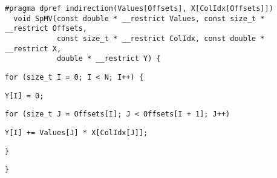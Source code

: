 \begin{lstlisting}[style=cppcode]
  #pragma dpref indirection(Values[Offsets], X[ColIdx[Offsets]])
  void SpMV(const double * __restrict Values, const size_t * __restrict Offsets,
            const size_t * __restrict ColIdx, const double * __restrict X,
            double * __restrict Y) {
\end{lstlisting}\vspace{-\baselineskip}

\begin{lstlisting}[style=cppcode, backgroundcolor=\color{yellow!15}, firstnumber=last]
    for (size_t I = 0; I < N; I++) {
\end{lstlisting}\vspace{-\baselineskip}

\begin{lstlisting}[style=cppcode, backgroundcolor=\color{red!15}, firstnumber=last]
      Y[I] = 0;
\end{lstlisting}\vspace{-\baselineskip}

\begin{lstlisting}[style=cppcode, backgroundcolor=\color{green!15}, firstnumber=last]
      for (size_t J = Offsets[I]; J < Offsets[I + 1]; J++)
\end{lstlisting}\vspace{-\baselineskip}

\begin{lstlisting}[style=cppcode, backgroundcolor=\color{red!15}, firstnumber=last]
        Y[I] += Values[J] * X[ColIdx[J]];
\end{lstlisting}\vspace{-\baselineskip}

\begin{lstlisting}[style=cppcode, backgroundcolor=\color{yellow!15}, firstnumber=last]
    }
\end{lstlisting}\vspace{-\baselineskip}

\begin{lstlisting}[style=cppcode, firstnumber=last]
  }
\end{lstlisting}\vspace{-\baselineskip}
